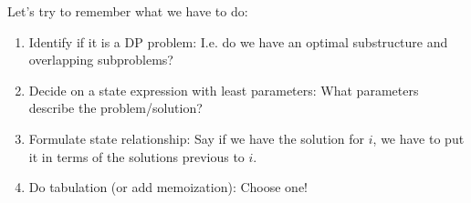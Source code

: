 \textbf{}

\RayNotesBegin

Let's try to remember what we have to do:
\begin{enumerate}[label=\textbf{\arabic*.}]
\item Identify if it is a DP problem: I.e. do we have an optimal
  substructure and overlapping subproblems?
\item Decide on a state expression with least parameters: What parameters
  describe the problem/solution?
\item Formulate state relationship: Say if we have the solution for $i$, we
  have to put it in terms of the solutions previous to $i$.
\item Do tabulation (or add memoization): Choose one!
\end{enumerate}

